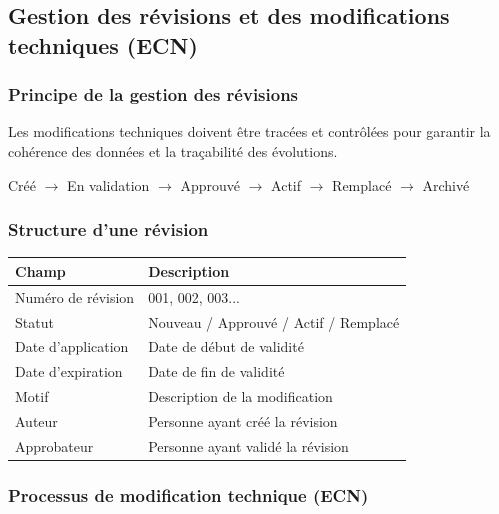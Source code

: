 \documentclass{article}
\begin{document}
\begin{table}[h]
\subsection{Gestion des révisions et des modifications techniques (ECN)}

\subsubsection{Principe de la gestion des révisions}

Les modifications techniques doivent être tracées et contrôlées pour garantir la cohérence des données et la traçabilité des évolutions.

\begin{tcolorbox}[colback=blueclair, colframe=blue!70!black, title=Cycle de vie d'une révision]
\begin{center}
Créé $\rightarrow$ En validation $\rightarrow$ Approuvé $\rightarrow$ Actif $\rightarrow$ Remplacé $\rightarrow$ Archivé
\end{center}
\end{tcolorbox}

\subsubsection{Structure d'une révision}

\begin{table}[h]
\centering
\begin{tabular}{|l|l|}
\hline
\textbf{Champ} & \textbf{Description} \\
\hline
Numéro de révision & 001, 002, 003... \\
Statut & Nouveau / Approuvé / Actif / Remplacé \\
Date d'application & Date de début de validité \\
Date d'expiration & Date de fin de validité \\
Motif & Description de la modification \\
Auteur & Personne ayant créé la révision \\
Approbateur & Personne ayant validé la révision \\
\hline
\end{tabular}
\end{table}

\subsubsection{Processus de modification technique (ECN)}


\end{table}
\end{document}
